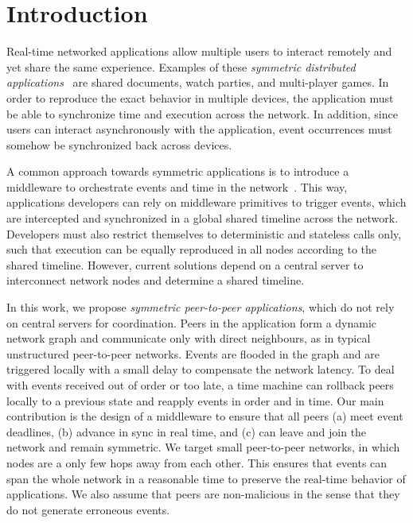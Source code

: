 \documentclass[fleqn,10pt]{SelfArx}
\affiliation{\textsuperscript{1}\textit{Department of Computer Science, Rio de Janeiro State University (UERJ), Brazil}}
\affiliation{*\textbf{Corresponding author}: francisco@ime.uerj.br}
\begin{document}

\flushbottom %
\thispagestyle{empty} %

\section{Introduction} %
\label{sec.introduction}

Real-time networked applications allow multiple users to interact remotely and
yet share the same experience.
Examples of these \emph{symmetric distributed applications}~\cite{gals} are
shared documents, watch parties, and multi-player games.
%
In order to reproduce the exact behavior in multiple devices, the application
must be able to synchronize time and execution across the network.
In addition, since users can interact asynchronously with the application,
event occurrences must somehow be synchronized back across devices.

A common approach towards symmetric applications is to introduce a middleware
to orchestrate events and time in the network~\cite{gals,croquet}.
This way, applications developers can rely on middleware primitives to trigger
events, which are intercepted and synchronized in a global shared timeline
across the network.
Developers must also restrict themselves to deterministic and stateless calls
only, such that execution can be equally reproduced in all nodes according to
the shared timeline.
However, current solutions depend on a central server to interconnect network
nodes and determine a shared timeline.

In this work, we propose \emph{symmetric peer-to-peer applications}, which
do not rely on central servers for coordination.
Peers in the application form a dynamic network graph and communicate only
with direct neighbours, as in typical unstructured peer-to-peer networks.
Events are flooded in the graph and are triggered locally with a small delay
to compensate the network latency.
To deal with events received out of order or too late, a time machine can
rollback peers locally to a previous state and reapply events in order and
in time.
Our main contribution is the design of a middleware to ensure that all peers
    (a) meet event deadlines,
    (b) advance in sync in real time, and
    (c) can leave and join the network and remain symmetric.
We target small peer-to-peer networks, in which nodes are a only few hops away
from each other.
This ensures that events can span the whole network in a reasonable time to
preserve the real-time behavior of applications.
We also assume that peers are non-malicious in the sense that they do not
generate erroneous events.
\end{document}

